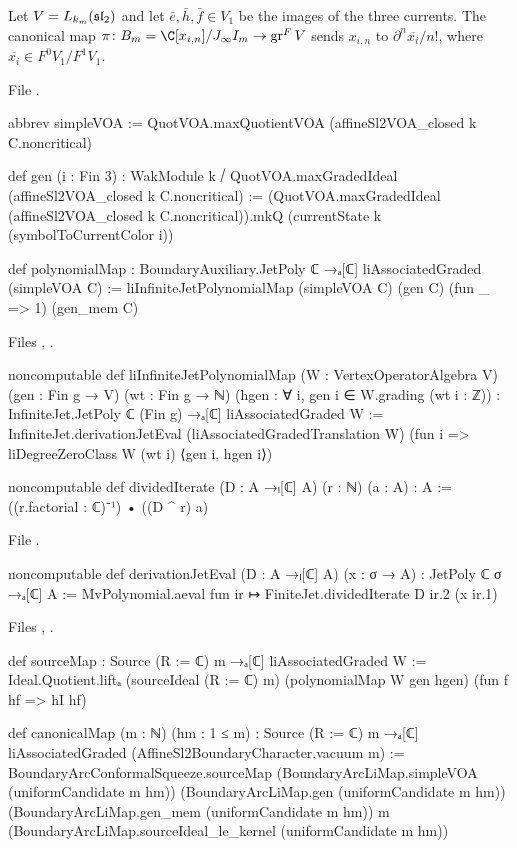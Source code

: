 \begin{definition}\label{l20:def:canonical}
Let $V=L_{k_m}(\mathfrak{sl}_2)$ and let $\bar e,\bar h,\bar f\in V_1$ be the images of the three currents. The
canonical map $\pi\colon\ltwentyB=\C[x_{i,n}]/J_\infty I_m\to\ltwentygr V$ sends $x_{i,n}$ to
$\partial^n\overline{x_i}/n!$, where $\overline{x_i}\in F^0V_1/F^1V_1$.
\end{definition}
\noindent File .
\begin{leancode}
abbrev simpleVOA := QuotVOA.maxQuotientVOA (affineSl2VOA_closed k C.noncritical)

def gen (i : Fin 3) : WakModule k ⧸ QuotVOA.maxGradedIdeal (affineSl2VOA_closed k C.noncritical) :=
  (QuotVOA.maxGradedIdeal (affineSl2VOA_closed k C.noncritical)).mkQ
    (currentState k (symbolToCurrentColor i))

def polynomialMap : BoundaryAuxiliary.JetPoly ℂ →ₐ[ℂ] liAssociatedGraded (simpleVOA C) :=
  liInfiniteJetPolynomialMap (simpleVOA C) (gen C) (fun _ => 1) (gen_mem C)
\end{leancode}
\noindent Files ,
.
\begin{leancode}
noncomputable def liInfiniteJetPolynomialMap
    (W : VertexOperatorAlgebra V)
    (gen : Fin g → V) (wt : Fin g → ℕ)
    (hgen : ∀ i, gen i ∈ W.grading (wt i : ℤ)) :
    InfiniteJet.JetPoly ℂ (Fin g) →ₐ[ℂ] liAssociatedGraded W :=
  InfiniteJet.derivationJetEval (liAssociatedGradedTranslation W)
    (fun i => liDegreeZeroClass W (wt i) ⟨gen i, hgen i⟩)

noncomputable def dividedIterate (D : A →ₗ[ℂ] A) (r : ℕ) (a : A) : A :=
  ((r.factorial : ℂ)⁻¹) • ((D ^ r) a)
\end{leancode}
\noindent File .
\begin{leancode}
noncomputable def derivationJetEval (D : A →ₗ[ℂ] A) (x : σ → A) :
    JetPoly ℂ σ →ₐ[ℂ] A :=
  MvPolynomial.aeval fun ir ↦ FiniteJet.dividedIterate D ir.2 (x ir.1)
\end{leancode}
\noindent Files ,
.
\begin{leancode}
def sourceMap : Source (R := ℂ) m →ₐ[ℂ] liAssociatedGraded W :=
  Ideal.Quotient.liftₐ (sourceIdeal (R := ℂ) m) (polynomialMap W gen hgen)
    (fun f hf => hI hf)

def canonicalMap (m : ℕ) (hm : 1 ≤ m) :
    Source (R := ℂ) m →ₐ[ℂ] liAssociatedGraded (AffineSl2BoundaryCharacter.vacuum m) :=
  BoundaryArcConformalSqueeze.sourceMap
    (BoundaryArcLiMap.simpleVOA (uniformCandidate m hm))
    (BoundaryArcLiMap.gen (uniformCandidate m hm))
    (BoundaryArcLiMap.gen_mem (uniformCandidate m hm)) m
    (BoundaryArcLiMap.sourceIdeal_le_kernel (uniformCandidate m hm))
\end{leancode}
